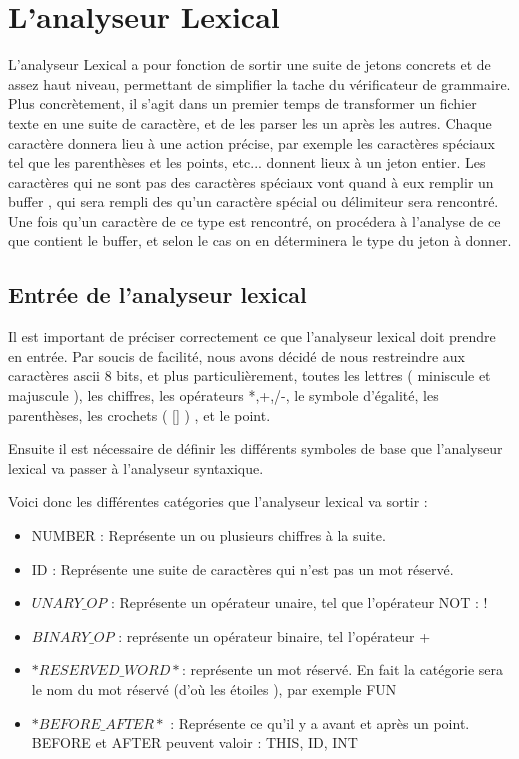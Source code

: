 \chapter{L'analyseur Lexical}

L'analyseur Lexical a pour fonction de sortir une suite de jetons concrets et de assez haut niveau, permettant de simplifier la tache du vérificateur de grammaire. Plus concrètement, il s'agit dans un premier temps de transformer un fichier texte en une suite de caractère, et de les parser les un après les autres. Chaque caractère donnera lieu à une action précise, par exemple les caractères spéciaux tel que les parenthèses et les points, etc... donnent lieux à un jeton entier.
Les caractères qui ne sont pas des caractères spéciaux vont quand à eux remplir un buffer , qui sera rempli des qu'un caractère spécial ou délimiteur sera rencontré. Une fois qu'un caractère de ce type est rencontré, on procédera à l'analyse de ce que contient le buffer, et selon le cas on en déterminera le type du jeton à donner.

\section{Entrée de l'analyseur lexical}

Il est important de préciser correctement ce que l'analyseur lexical doit prendre en entrée. Par soucis de facilité, nous avons décidé de nous restreindre aux caractères ascii 8 bits, et plus particulièrement, toutes les lettres ( miniscule et majuscule ), les chiffres, les opérateurs *,+,/-, le symbole d'égalité, les parenthèses, les crochets ( [] ) ,  et le point.

Ensuite il est nécessaire de définir les différents symboles de base que l'analyseur lexical va passer à l'analyseur syntaxique.

Voici donc les différentes catégories que l'analyseur lexical va sortir :

\begin{itemize}
\item NUMBER  : Représente un ou plusieurs chiffres à la suite.
\item ID : Représente une suite de caractères qui n'est pas un mot réservé.
\item $UNARY\_OP$ : Représente un opérateur unaire, tel que l'opérateur NOT : !
\item $BINARY\_OP$ : représente un opérateur binaire, tel l'opérateur +
\item $*RESERVED\_WORD*$: représente un mot réservé. En fait la catégorie sera le nom du mot réservé (d'où les étoiles ), par exemple FUN
\item $*BEFORE\_AFTER*$ : Représente ce qu'il y a avant et après un point. BEFORE et AFTER peuvent valoir : THIS, ID, INT
\end{itemize}



